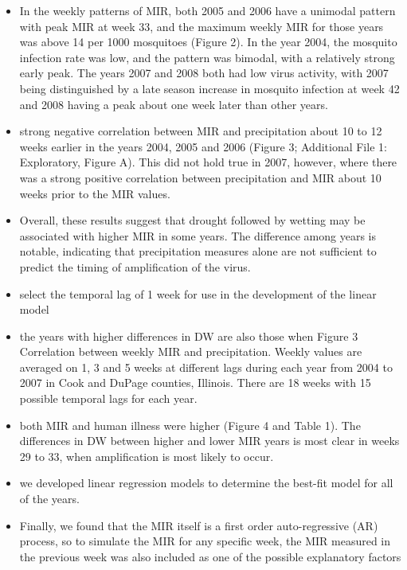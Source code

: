 \documentclass[a4, 12pt]{article}
\begin{document}
\begin{itemize}
\item In the weekly patterns of MIR, both 2005 and 2006
have a unimodal pattern with peak MIR at week 33, and
the maximum weekly MIR for those years was above
14 per 1000 mosquitoes (Figure 2). In the year 2004, the
mosquito infection rate was low, and the pattern was
bimodal, with a relatively strong early peak. The years
2007 and 2008 both had low virus activity, with 2007
being distinguished by a late season increase in mosquito
infection at week 42 and 2008 having a peak
about one week later than other years.
\item strong
negative correlation between MIR and precipitation
about 10 to 12 weeks earlier in the years 2004, 2005 and
2006 (Figure 3; Additional File 1: Exploratory, Figure A).
This did not hold true in 2007, however, where there
was a strong positive correlation between precipitation
and MIR about 10 weeks prior to the MIR values.
\item   Overall, these
results suggest that drought followed by wetting may be
associated with higher MIR in some years. The difference
among years is notable, indicating that precipitation
measures alone are not sufficient to predict the
timing of amplification of the virus.
\item  select
the temporal lag of 1 week for use in the development
of the linear model
\item the
years with higher differences in DW are also those when
Figure 3 Correlation between weekly MIR and precipitation. Weekly values are averaged on 1, 3 and 5 weeks at different lags during each
year from 2004 to 2007 in Cook and DuPage counties, Illinois. There are 18 weeks with 15 possible temporal lags for each year.
\item both MIR and human illness were higher (Figure 4 and
Table 1). The differences in DW between higher and
lower MIR years is most clear in weeks 29 to 33, when
amplification is most likely to occur.
\item we developed linear regression models to determine the best-fit model for all of the years.
\item Finally, we found that
the MIR itself is a first order auto-regressive (AR) process,
so to simulate the MIR for any specific week, the
MIR measured in the previous week was also included
as one of the possible explanatory factors

\end{itemize}
\end{document}
